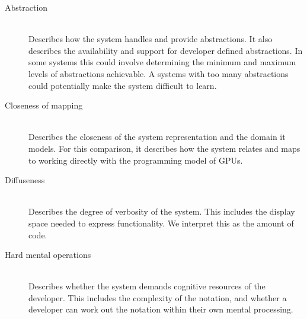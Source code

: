 \begin{description}
    \item[Abstraction]\hfill\\
    Describes how the system handles and provide abstractions. It also describes the availability and support for developer defined abstractions. In some systems this could involve determining the minimum and maximum levels of abstractions achievable. A systems with too many abstractions could potentially make the system difficult to learn.
    \item[Closeness of mapping]\hfill\\
    Describes the closeness of the system representation and the domain it models. For this comparison, it describes how the system relates and maps to working directly with the programming model of GPUs.  
    \item[Diffuseness]\hfill\\
    Describes the degree of verbosity of the system. This includes the display space needed to express functionality. We interpret this as the amount of code.
    \item[Hard mental operations]\hfill\\
    Describes whether the system demands cognitive resources of the developer. This includes the complexity of the notation, and whether a developer can work out the notation within their own mental processing.
\end{description}